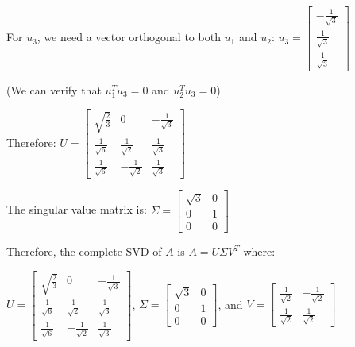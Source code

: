 For $u_3$, we need a vector orthogonal to both $u_1$ and $u_2$:
$u_3 = \begin{bmatrix} -\frac{1}{\sqrt{3}} \\ \frac{1}{\sqrt{3}} \\ \frac{1}{\sqrt{3}} \end{bmatrix}$

(We can verify that $u_1^T u_3 = 0$ and $u_2^T u_3 = 0$)

Therefore:
$U = \begin{bmatrix} \sqrt{\frac{2}{3}} & 0 & -\frac{1}{\sqrt{3}} \\ 
\frac{1}{\sqrt{6}} & \frac{1}{\sqrt{2}} & \frac{1}{\sqrt{3}} \\
\frac{1}{\sqrt{6}} & -\frac{1}{\sqrt{2}} & \frac{1}{\sqrt{3}} \end{bmatrix}$

The singular value matrix is:
$\Sigma = \begin{bmatrix} \sqrt{3} & 0 \\ 0 & 1 \\ 0 & 0 \end{bmatrix}$

Therefore, the complete SVD of $A$ is $A = U\Sigma V^T$ where:

$U = \begin{bmatrix} \sqrt{\frac{2}{3}} & 0 & -\frac{1}{\sqrt{3}} \\ 
\frac{1}{\sqrt{6}} & \frac{1}{\sqrt{2}} & \frac{1}{\sqrt{3}} \\
\frac{1}{\sqrt{6}} & -\frac{1}{\sqrt{2}} & \frac{1}{\sqrt{3}} \end{bmatrix}$, 
$\Sigma = \begin{bmatrix} \sqrt{3} & 0 \\ 0 & 1 \\ 0 & 0 \end{bmatrix}$, and 
$V = \begin{bmatrix} \frac{1}{\sqrt{2}} & -\frac{1}{\sqrt{2}} \\ \frac{1}{\sqrt{2}} & \frac{1}{\sqrt{2}} \end{bmatrix}$
\newpage